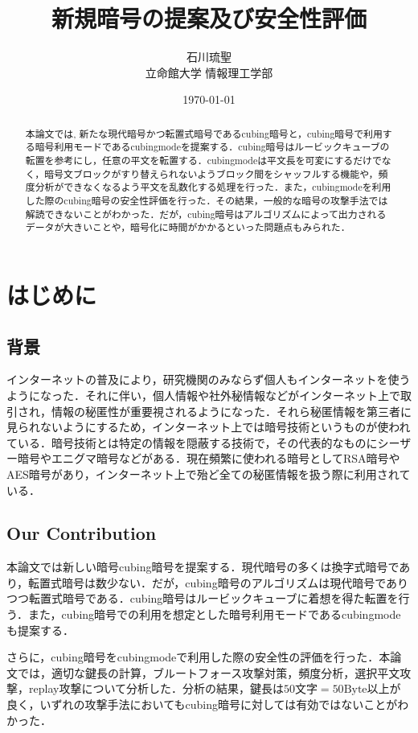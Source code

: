 \documentclass[a4j,titlepage]{jsarticle}
\title{新規暗号の提案及び安全性評価}
\author{石川琉聖\\立命館大学 情報理工学部}
\date{\today}
\begin{document}
\maketitle

\begin{abstract}
本論文では, 新たな現代暗号かつ転置式暗号であるcubing暗号と，cubing暗号で利用する暗号利用モードであるcubingmodeを提案する．cubing暗号はルービックキューブの転置を参考にし，任意の平文を転置する．cubingmodeは平文長を可変にするだけでなく，暗号文ブロックがすり替えられないようブロック間をシャッフルする機能や，頻度分析ができなくなるよう平文を乱数化する処理を行った．また，cubingmodeを利用した際のcubing暗号の安全性評価を行った．その結果，一般的な暗号の攻撃手法では解読できないことがわかった．だが，cubing暗号はアルゴリズムによって出力されるデータが大きいことや，暗号化に時間がかかるといった問題点もみられた．
\end{abstract}

\setcounter{tocdepth}{3}
\tableofcontents
\newpage
{}

\section{はじめに}
\subsection{背景}
インターネットの普及により，研究機関のみならず個人もインターネットを使うようになった．それに伴い，個人情報や社外秘情報などがインターネット上で取引され，情報の秘匿性が重要視されるようになった．それら秘匿情報を第三者に見られないようにするため，インターネット上では暗号技術というものが使われている．暗号技術とは特定の情報を隠蔽する技術で，その代表的なものにシーザー暗号やエニグマ暗号などがある．現在頻繁に使われる暗号としてRSA暗号やAES暗号があり，インターネット上で殆ど全ての秘匿情報を扱う際に利用されている．

\subsection{Our Contribution}
本論文では新しい暗号cubing暗号を提案する．現代暗号の多くは換字式暗号であり，転置式暗号は数少ない．だが，cubing暗号のアルゴリズムは現代暗号でありつつ転置式暗号である．cubing暗号はルービックキューブに着想を得た転置を行う．また，cubing暗号での利用を想定とした暗号利用モードであるcubingmodeも提案する．

さらに，cubing暗号をcubingmodeで利用した際の安全性の評価を行った．本論文では，適切な鍵長の計算，ブルートフォース攻撃対策，頻度分析，選択平文攻撃，replay攻撃について分析した．分析の結果，鍵長は\(50\)文字\(=50\text{Byte}\)以上が良く，いずれの攻撃手法においてもcubing暗号に対しては有効ではないことがわかった．
\end{document}
